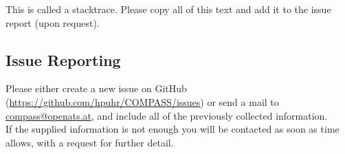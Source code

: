 This is called a stacktrace. Please copy all of this text and add it to the issue report (upon request).


\subsection{Issue Reporting}

Please either create a new issue on GitHub (\url{https://github.com/hpuhr/COMPASS/issues}) or send a mail to \href{mailto:compass@openats.at}{compass@openats.at}, and include all of the previously collected information. \\

If the supplied information is not enough you will be contacted as soon as time allows, with a request for further detail.


